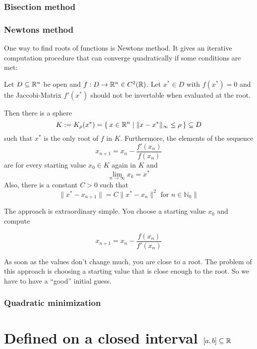 \subsubsection{Bisection method}

\subsubsection{Newtons method}
One way to find roots of functions is Newtons method. It gives an
iterative computation procedure that can converge quadratically 
if some conditions are met:

\begin{theorem}
    Let $D \subseteq \mathbb{R}^n$ be open and $f: D \rightarrow \mathbb{R}^n \in C^2(\mathbb{R})$.
    Let $x^* \in D$ with $f(x^*) = 0$ and the Jaccobi-Matrix $f'(x^*)$
    should not be invertable when evaluated at the root.

    Then there is a sphere 
    \[K := K_\rho(x^*) = \Set{x \in \ensuremath{\mathbb{R}}^n | \|x- x^*\|_\infty \leq \rho} \subseteq D\]
    such that $x^*$ is the only root of $f$ in $K$. Furthermore,
    the elements of the sequence
    \[ x_{n+1} = x_n - \frac{f'(x_n)}{f(x_n)}\]
    are for every starting value $x_0 \in K$ again in $K$ and
    \[\lim_{n \rightarrow \infty} x_k = x^*\]
    Also, there is a constant $C > 0$ such that
    \[\|x^* - x_{n+1} \| = C \|x^* - x_n\|^2 \text{ for } n \in \mathbb{N}_0\|\]
\end{theorem}

The approach is extraordinary simple. You choose a starting value
$x_0$ and compute

\[x_{n+1} = x_n - \frac{f(x_n)}{f'(x_n)}\]

As soon as the values don't change much, you are close to a root.
The problem of this approach is choosing a starting value that is
close enough to the root. So we have to have a \enquote{good}
initial guess.

\subsubsection{Quadratic minimization}
\clearpage

\section{Defined on a closed interval $[a,b] \subseteq \mathbb{R}$}
